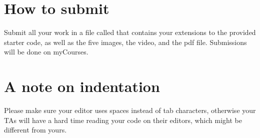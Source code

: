 \documentclass[a4paper,10pt]{article}
\begin{document}
\section{How to submit}
Submit all your work in a file called  that contains your extensions to the provided starter code, as well as the five images, the video, and the pdf file. 
Submissions will be done on myCourses. 

\section{A note on indentation}
Please make sure your editor uses spaces instead of tab characters, otherwise your TAs will have a hard time reading your code on their editors, which might be different from yours.
\end{document}
